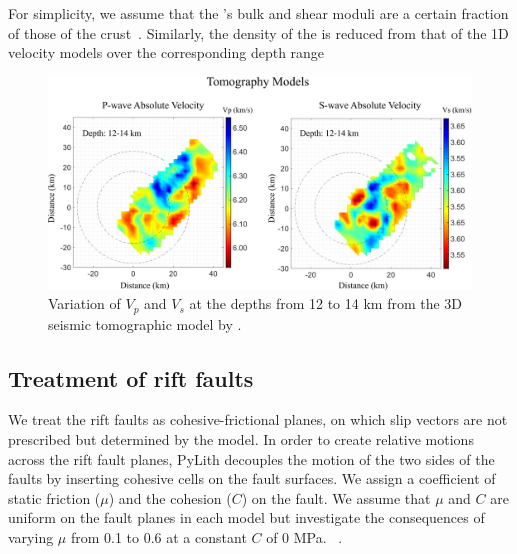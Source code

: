 \documentclass[draft]{agujournal2018}
\begin{document}
For simplicity, we assume that the 's bulk and shear moduli are a certain fraction of those of the crust~\citep[e.g.,][]{Baird_2010}. Similarly, the density of the  is reduced  from that of the 1D velocity models over the corresponding depth range 

\begin{figure}[ht]
\centering
\includegraphics[width=30pc]{Figures/TOMO_vel_models.png}
\caption{Variation of $V_p$ and $V_s$ at the depths from 12 to 14 km from the 3D seismic tomographic model by \citet{Powell_2017}.}
\label{figfour}
\end{figure}

\subsection{Treatment of rift faults}
We treat the rift faults as cohesive-frictional planes, on which slip vectors are not prescribed but determined by the model. In order to create relative motions across the rift fault planes, PyLith decouples the motion of the two sides of the faults by inserting cohesive cells on the fault surfaces. We assign a coefficient of static friction ($\mu$) and the cohesion ($C$) on the fault. We assume that $\mu$ and $C$ are uniform on the fault planes in each model but investigate the consequences of varying $\mu$ from 0.1 to 0.6 at a constant $C$ of 0 MPa. ~\citep{Marone_Chris}. 
\end{document}
